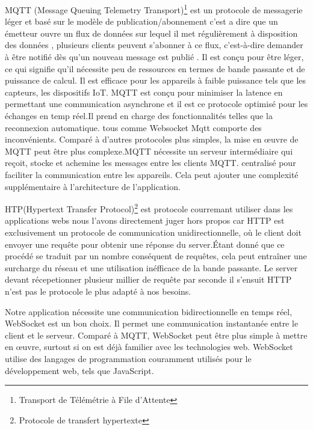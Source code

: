 \documentclass[12pt]{article}
\begin{document}
\justify
\text MQTT (Message Queuing Telemetry Transport)\footnote{Transport de Télémétrie à File d'Attente} est un protocole de messagerie léger et basé sur le modèle de publication/abonnement c'est a dire que un émetteur ouvre un flux de données sur lequel il met régulièrement à disposition des données , plusieurs clients peuvent s'abonner à ce flux, c'est-à-dire demander à être notifié dès qu'un nouveau message est publié . Il  est conçu pour être léger, ce qui signifie qu'il nécessite peu de ressources en termes de bande passante et de puissance de calcul. Il est efficace pour les appareils à faible puissance tels que les capteurs, les dispositifs IoT. MQTT est conçu pour minimiser la latence en permettant une communication asynchrone et il est ce protocole optimisé pour les échanges en temp réel.Il prend en charge des fonctionnalités telles que la reconnexion automatique. tous comme Websocket Mqtt comporte des inconvénients. Comparé à d'autres protocoles plus simples, la mise en œuvre de MQTT peut être plus complexe.MQTT nécessite un serveur intermédiaire qui reçoit, stocke et achemine les messages entre les clients MQTT. centralisé pour faciliter la communication entre les appareils. Cela peut ajouter une complexité supplémentaire à l'architecture de l'application. 

\justify
\text HTP(Hypertext Transfer Protocol)\footnote{Protocole de transfert hypertexte} est protocole courremant utiliser dans les applications webs nous l'avons directement juger hors propos car HTTP est exclusivement un protocole de communication unidirectionnelle, où le client doit envoyer une requête pour obtenir une réponse du server.Étant donné que ce procédé se traduit par un nombre conséquent de requêtes, cela peut entraîner une surcharge du réseau et une utilisation inéfficace de la bande passante. Le server  devant récepetionner plusieur millier de requête par seconde il s'ensuit HTTP n'est pas le protocole le plus adapté à nos besoins. 

\justify
\text Notre application nécessite une communication bidirectionnelle en temps réel, WebSocket est un bon choix. Il permet une communication instantanée entre le client et le serveur. Comparé à MQTT, WebSocket peut être plus simple à mettre en œuvre, surtout si on est  déjà familier avec les technologies web. WebSocket utilise des langages de programmation couramment utilisés pour le développement web, tels que JavaScript.



\vspace{20pt}
\end{document}
